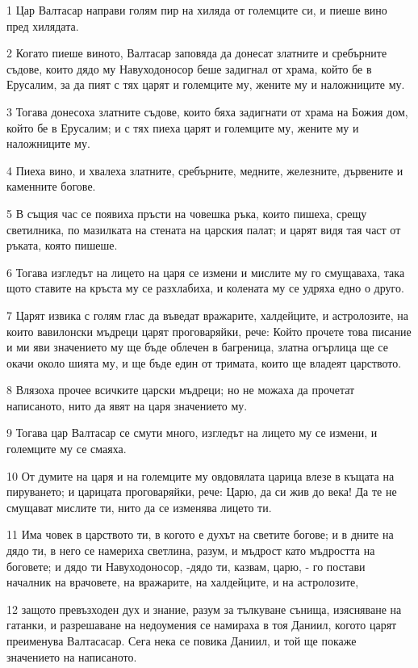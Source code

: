 \par 1 Цар Валтасар направи голям пир на хиляда от големците си, и пиеше вино пред хилядата.
\par 2 Когато пиеше виното, Валтасар заповяда да донесат златните и сребърните съдове, които дядо му Навуходоносор беше задигнал от храма, който бе в Ерусалим, за да пият с тях царят и големците му, жените му и наложниците му.
\par 3 Тогава донесоха златните съдове, които бяха задигнати от храма на Божия дом, който бе в Ерусалим; и с тях пиеха царят и големците му, жените му и наложниците му.
\par 4 Пиеха вино, и хвалеха златните, сребърните, медните, железните, дървените и каменните богове.
\par 5 В същия час се появиха пръсти на човешка ръка, които пишеха, срещу светилника, по мазилката на стената на царския палат; и царят видя тая част от ръката, която пишеше.
\par 6 Тогава изгледът на лицето на царя се измени и мислите му го смущаваха, така щото ставите на кръста му се разхлабиха, и колената му се удряха едно о друго.
\par 7 Царят извика с голям глас да въведат вражарите, халдейците, и астролозите, на които вавилонски мъдреци царят проговаряйки, рече: Който прочете това писание и ми яви значението му ще бъде облечен в багреница, златна огърлица ще се окачи около шията му, и ще бъде един от тримата, които ще владеят царството.
\par 8 Влязоха прочее всичките царски мъдреци; но не можаха да прочетат написаното, нито да явят на царя значението му.
\par 9 Тогава цар Валтасар се смути много, изгледът на лицето му се измени, и големците му се смаяха.
\par 10 От думите на царя и на големците му овдовялата царица влезе в къщата на пируването; и царицата проговаряйки, рече: Царю, да си жив до века! Да те  не смущават мислите ти, нито да се изменява лицето ти.
\par 11 Има човек в царството ти, в когото е духът на светите богове; и в дните на дядо ти, в него се намериха светлина, разум, и мъдрост като мъдростта на боговете; и дядо ти Навуходоносор, -дядо ти, казвам, царю, - го постави началник на врачовете, на вражарите, на халдейците, и на астролозите,
\par 12 защото превъзходен дух и знание, разум за тълкуване сънища, изясняване на гатанки, и разрешаване на недоумения се намираха в тоя Даниил, когото царят преименува Валтасасар. Сега нека се повика Даниил, и той ще покаже значението на написаното.
